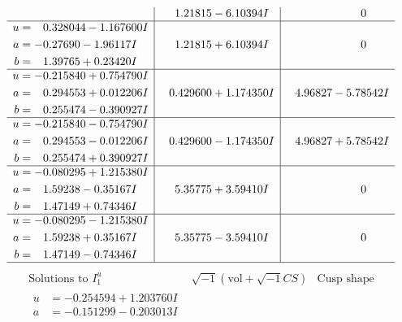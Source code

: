 \documentclass[1p]{elsarticle_modified}
\theoremstyle{definition}
\newcommand{\I}{\sqrt{-1}}
\begin{document}
$$\begin{array}{c|c|c}
 & \phantom{-}1.21815 - 6.10394 I & \phantom{-0.000000 } 0 \\ \hline\begin{aligned}
u &= \phantom{-}0.328044 - 1.167600 I \\
a &= -0.27690 - 1.96117 I \\
b &= \phantom{-}1.39765 + 0.23420 I\end{aligned}
 & \phantom{-}1.21815 + 6.10394 I & \phantom{-0.000000 } 0 \\ \hline\begin{aligned}
u &= -0.215840 + 0.754790 I \\
a &= \phantom{-}0.294553 + 0.012206 I \\
b &= \phantom{-}0.255474 - 0.390927 I\end{aligned}
 & \phantom{-}0.429600 + 1.174350 I & \phantom{-}4.96827 - 5.78542 I \\ \hline\begin{aligned}
u &= -0.215840 - 0.754790 I \\
a &= \phantom{-}0.294553 - 0.012206 I \\
b &= \phantom{-}0.255474 + 0.390927 I\end{aligned}
 & \phantom{-}0.429600 - 1.174350 I & \phantom{-}4.96827 + 5.78542 I \\ \hline\begin{aligned}
u &= -0.080295 + 1.215380 I \\
a &= \phantom{-}1.59238 - 0.35167 I \\
b &= \phantom{-}1.47149 + 0.74346 I\end{aligned}
 & \phantom{-}5.35775 + 3.59410 I & \phantom{-0.000000 } 0 \\ \hline\begin{aligned}
u &= -0.080295 - 1.215380 I \\
a &= \phantom{-}1.59238 + 0.35167 I \\
b &= \phantom{-}1.47149 - 0.74346 I\end{aligned}
 & \phantom{-}5.35775 - 3.59410 I & \phantom{-0.000000 } 0\\
 \hline 
 \end{array}$$\newpage$$\begin{array}{c|c|c}  
\text{Solutions to }I^u_{1}& \I (\text{vol} + \sqrt{-1}CS) & \text{Cusp shape}\\
 \hline 
\begin{aligned}
u &= -0.254594 + 1.203760 I \\
a &= -0.151299 - 0.203013 I \\

\end{aligned}
\end{array}$$
\end{document}
